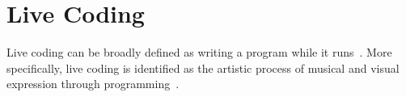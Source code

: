 





\section{Live Coding}

Live coding can be broadly defined as writing a program while it runs~\cite{Ward2004}. More specifically, live coding is identified as the artistic process of musical and visual expression through programming~\cite{Collins2003}.


